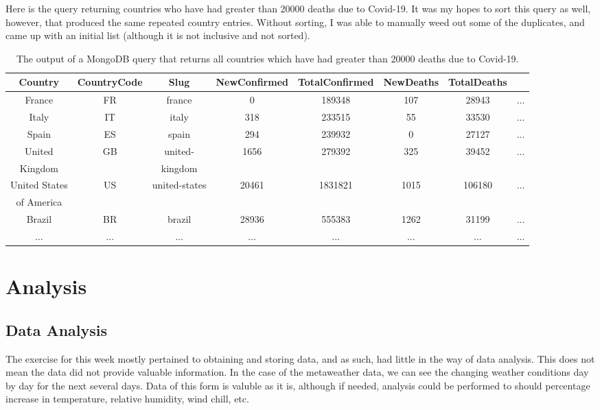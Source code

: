 \documentclass[]{article}
\begin{document}
Here is the query returning countries who have had greater than 20000 deaths due to Covid-19.  It was my hopes to sort this query as well, however, that produced the same repeated country entries.  Without sorting, I was able to manually weed out some of the duplicates, and came up with an initial list (although it is not inclusive and not sorted).
\begin{table}[!ht]
	\begin{center}
		\caption{The output of a MongoDB query that returns all countries which have had greater than 20000 deaths due to Covid-19.}
		\label{tab:table1}
		\begin{tabular}{|c|c|c|c|c|c|c|c|}
			\hline
			Country&CountryCode&Slug&NewConfirmed&TotalConfirmed&NewDeaths&TotalDeaths&\\
			\hline
			France&	FR&	france&	0&	189348&	107&	28943&	...	\\
			Italy&	IT&	italy&	318&	233515	&55	&33530&	...\\
			Spain&	ES	&spain&	294	&239932&	0&	27127&	...\\
			United 	&GB	&united-	&1656&	279392&	325&	39452&	...\\
			Kingdom	&	&kingdom	&&	&&	&	\\
			United States &	US&	united-states&	20461&	1831821	&1015&	106180&	...\\
			of America&	&	&&		&&	&		\\
			Brazil&	BR&	brazil&	28936&	555383&	1262&	31199&	...\\
			...&...	&...&...&...&...&...&...\\
			\hline
		\end{tabular}
	\end{center}
\end{table}
\section{Analysis}
\subsection{Data Analysis}

The exercise for this week mostly pertained to obtaining and storing data, and as such, had little in the way of data analysis.  This does not mean the data did not provide valuable information.  In the case of the metaweather data, we can see the changing weather conditions day by day for the next several days.  Data of this form is valuble as it is, although if needed, analysis could be performed to should percentage increase in temperature, relative humidity, wind chill, etc.
\end{document}
